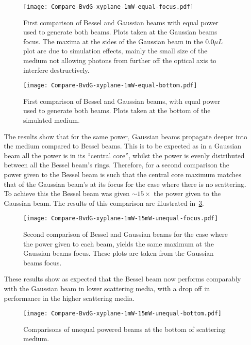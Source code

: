 \begin{figure}[!htbp]
    \centering
    \texttt{[image: Compare-BvdG-xyplane-1mW-equal-focus.pdf]}
    \caption{First comparison of Bessel and Gaussian beams with equal power used to generate both beams. Plots taken at the Gaussian beams focus. The maxima at the sides of the Gaussian beam in the $0.0\mu L$plot are due to simulation effects, mainly the small size of the medium not allowing photons from further off the optical axis to interfere destructively.}
    \label{fig:1stcomp}
\end{figure}

\begin{figure}[!htbp]
    \centering
    \texttt{[image: Compare-BvdG-xyplane-1mW-equal-bottom.pdf]}
    \caption{First comparison of Bessel and Gaussian beams, with equal power used to generate both beams. Plots taken at the bottom of the simulated medium.}
    \label{fig:1stcomp-1}
\end{figure}

The results show that for the same power, Gaussian beams propagate deeper into the medium compared to Bessel beams.
This is to be expected as in a Gaussian beam all the power is in its ``central core'', whilst the power is evenly distributed between all the Bessel beam's rings.
Therefore, for a second comparison the power given to the Bessel beam is such that the central core maximum matches that of the Gaussian beam's at its focus for the case where there is no scattering.
To achieve this the Bessel beam was given $\sim 15\times$ the power given to the Gaussian beam.
The results of this comparison are illustrated in~\cref{fig:2ndcomp}.

\begin{figure}[!htbp]
    \centering
    \texttt{[image: Compare-BvdG-xyplane-1mW-15mW-unequal-focus.pdf]}
    \caption{Second comparison of Bessel and Gaussian beams for the case where the power given to each beam, yields the same maximum at the Gaussian beams focus. These plots are taken from the Gaussian beams focus.}
    \label{fig:2ndcomp}
\end{figure}

These results show as expected that the Bessel beam now performs comparably with the Gaussian beam in lower scattering media, with a drop off in performance in the higher scattering media.

\begin{figure}[!htpb]
    \centering
    \texttt{[image: Compare-BvdG-xyplane-1mW-15mW-unequal-bottom.pdf]}
    \caption{Comparisons of unequal powered beams at the bottom of scattering medium.}
    \label{fig:2ncompbottom}
\end{figure}


